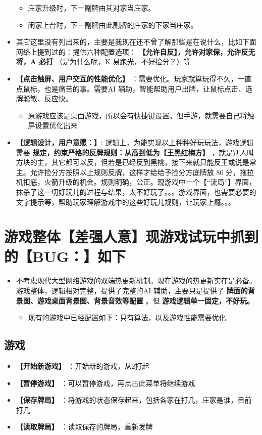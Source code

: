\documentclass[9pt, b5paper]{article}
\begin{document}
\begin{itemize}
\begin{itemize}
\item 庄家升级时，下一副牌由其对家当庄家。
\item 闲家上台时，下一副牌由此副牌的庄家的下家当庄家。
\end{itemize}
\item 其它这里没有列出来的，主要是我现在还不曾了解那些是在说什么，比如下面网络上提到过的：提供六种配置选项： \textbf{【允许自反】，允许对家保，允许反无将，A 必打} （是为什么呢，K 易跑光，不好捡分？）等
\item \textbf{【点击触屏、用户交互的性能优化】} ：需要优化。玩家就算玩得不久，一直点鼠标，也是痛苦的事。需要AI 辅助，智能帮助用户出牌，让鼠标点击、选牌聪敏、反应快。
\begin{itemize}
\item 原游戏应该是桌面游戏，所以会有快捷键设置。但手游，就需要自己将触屏设置优化出来
\end{itemize}
\item \textbf{【逻辑设计，用户意愿：】}: 逻辑上，为能实现以上种种好玩玩法，游戏逻辑需要 \textbf{规定，约束严格的反牌规则：从高到低为【王黑红梅方】} ，就是别人叫方块的主，其它都可以反，但若是已经反到黑桃，接下来就只能反王或说是常主。允许捡分方按照以上规则反牌，这样才给给予捡分方底牌放 80 分，拖拉机扣底，火箭升级的机会。规则明确，公正。现游戏中一个【“流局”】界面，抹杀了这一切好玩儿的过程与结果，太不好玩了。。。游戏界面，也需要必要的文字提示等，帮助玩家理解游戏中的这些好玩儿规则，让玩家上瘾。。。
\end{itemize}
\section{游戏整体【差强人意】现游戏试玩中抓到的【BUG：】如下}
\label{sec-3}
\begin{itemize}
\item 不考虑现代大型网络游戏的双端热更新机制。现在游戏的热更新实在是必备。游戏整体，逻辑相对完整，提供了完整的AI 辅助，主要只是提供了 \textbf{牌面的背景图、游戏桌面背景图、背景音效等配置} 。但 \textbf{游戏逻辑单一固定，不好玩。}
\begin{itemize}
\item 现有的游戏中已经配置如下：只有算法，以及游戏性能需要优化
\end{itemize}
\end{itemize}
\subsection{游戏}
\label{sec-3-1}
\begin{itemize}
\item \textbf{【开始新游戏】} ：开始新的游戏，从2打起
\item \textbf{【暂停游戏】} ：可以暂停游戏，再点击此菜单将继续游戏
\item \textbf{【保存牌局】} ：将游戏的状态保存起来，包括各家在打几，庄家是谁，目前打几
\item \textbf{【读取牌局】} ：读取保存的牌局，重新发牌
\end{itemize}
\end{document}
